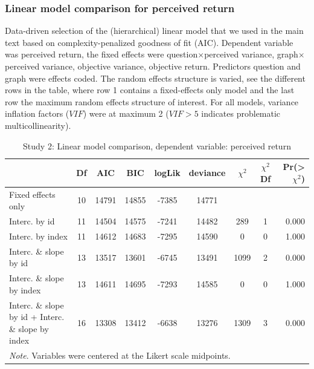 \subsubsection{Linear model comparison for perceived return}
Data-driven selection of the (hierarchical) linear model that we used in the main text based on complexity-penalized goodness of fit (AIC). Dependent variable was perceived return, the fixed effects were question$\times$perceived variance, graph$\times$perceived variance, objective variance, objective return. Predictors question and graph were effects coded. The random effects structure is varied, see the different rows in the table, where row 1 contains a fixed-effects only model and the last row the maximum random effects structure of interest. For all models, variance inflation factors ($VIF$) were at maximum 2 ($VIF > 5$ indicates problematic multicollinearity).
\begin{table}[H]
\centering
\caption{Study 2: Linear model comparison, dependent variable: perceived return} 
\label{tab:study2_lm_return_modelcomparison}
\begin{tabular}{p{4.3cm}cccccccr}
  \toprule
 & Df & AIC & BIC & logLik & deviance & $\chi^2$ & $\chi^2$Df & Pr(>$\chi^2$) \\ 
  \midrule
Fixed effects only & 10 & 14791 & 14855 & -7385 & 14771 &  &  &  \\ 
  Interc. by id & 11 & 14504 & 14575 & -7241 & 14482 & 289 & 1 & 0.000 \\ 
  Interc. by index & 11 & 14612 & 14683 & -7295 & 14590 & 0 & 0 & 1.000 \\ 
  Interc. \& slope by id & 13 & 13517 & 13601 & -6745 & 13491 & 1099 & 2 & 0.000 \\ 
  Interc. \& slope by index & 13 & 14611 & 14695 & -7293 & 14585 & 0 & 0 & 1.000 \\ 
  Interc. \& slope by id + Interc. \& slope by index & 16 & 13308 & 13412 & -6638 & 13276 & 1309 & 3 & 0.000 \\ 
   \bottomrule
   \multicolumn{9}{l}{\small\textit{Note}. Variables were centered at the Likert scale midpoints.}\end{tabular}
\end{table}


